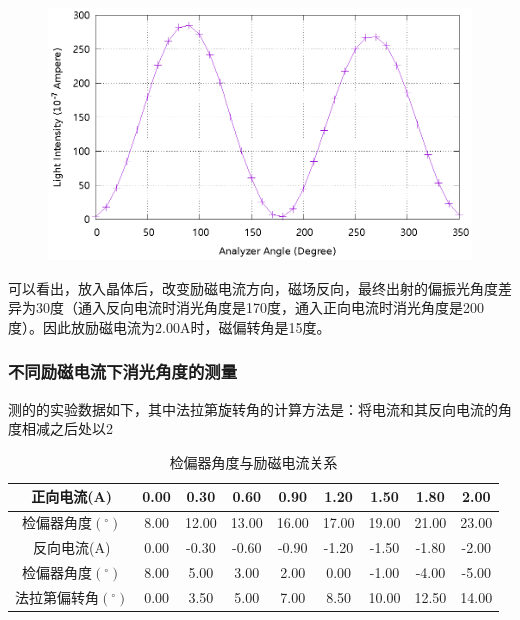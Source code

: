 \documentclass{ctexart}
\newcommand{\si}[1]{\mathrm{#1}}
\let\oldsubsubsection\subsubsection
\renewcommand{\subsubsection}[1]{\oldsubsubsection{\!\!\!\!\!\!#1}}
\begin{document}
\begin{figure}[H]
    \centering
    \includegraphics[width=\linewidth]{optics-figures/analyzer-angle-light-intensity-4.gnuplot}
\end{figure}

可以看出，放入晶体后，改变励磁电流方向，磁场反向，最终出射的偏振光角度差异为30度（通入反向电流时消光角度是170度，通入正向电流时消光角度是200度）。因此放励磁电流为$2.00 \si{A}$时，磁偏转角是15度。

\newpage
\subsubsection{不同励磁电流下消光角度的测量}

测的的实验数据如下，其中法拉第旋转角的计算方法是：将电流和其反向电流的角度相减之后处以2

\begin{table}[H]
    \centering
    \begin{tabular}{|c|c|c|c|c|c|c|c|c|}
        \hline
        正向电流(A)              & 0.00 & 0.30 & 0.60 & 0.90 & 1.20 & 1.50 & 1.80 & 2.00 \\\hline
        检偏器角度$({}^{\circ})$  & 8.00 & 12.00 & 13.00 & 16.00 & 17.00 & 19.00 & 21.00 & 23.00 \\\hline
        反向电流(A)              & 0.00 & -0.30 & -0.60 & -0.90 & -1.20 & -1.50 & -1.80 & -2.00 \\\hline
        检偏器角度$({}^{\circ})$  & 8.00 & 5.00 & 3.00 & 2.00 & 0.00 & -1.00 & -4.00 & -5.00 \\\hline
        法拉第偏转角$({}^{\circ})$ & 0.00 & 3.50 & 5.00 & 7.00 & 8.50 & 10.00 & 12.50 & 14.00 \\\hline
    \end{tabular}
    \caption{检偏器角度与励磁电流关系}
\end{table}
\end{document}
